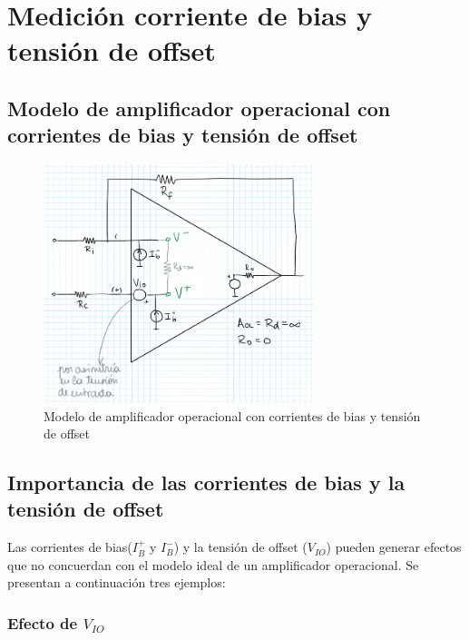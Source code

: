\documentclass[../../main.tex]{subfiles}
\begin{document}
\section{Medici\'on corriente de bias y tensi\'on de offset}


\subsection{Modelo de amplificador operacional con corrientes de bias y tensi\'on de offset}

\begin{figure}[htb]	%
	\centering
	\includegraphics[width=0.7\textwidth]{imagenes/modelo_opamp_vio_ibias.png}
	\caption{Modelo de amplificador operacional con corrientes de bias y tensi\'on de offset}
	\label{fig:ej_3_modelo_opamp_vio_ibias}
\end{figure}






\subsection{Importancia de las corrientes de bias y la tensi\'on de offset}


Las corrientes de bias($I_B^+$ y $I_B^-$) y la tensi\'on de offset ($V_{IO}$) pueden generar efectos que no concuerdan con el modelo ideal de un amplificador operacional. Se presentan a continuaci\'on tres ejemplos:

\subsubsection*{Efecto de $V_{IO}$}
\end{document}
